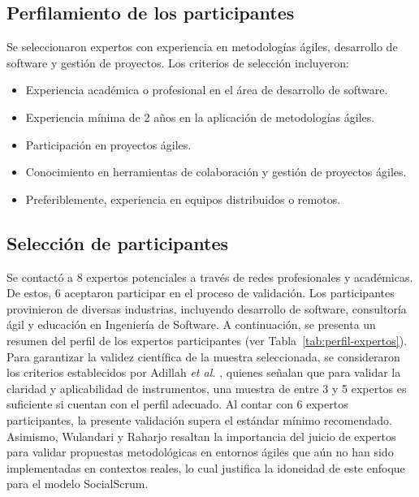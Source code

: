 \subsection{Perfilamiento de los participantes}
Se seleccionaron expertos con experiencia en metodologías ágiles, desarrollo de software y gestión de proyectos. Los criterios de selección incluyeron:
\begin{itemize}
   \item Experiencia académica o profesional en el área de desarrollo de software.
   \item Experiencia mínima de 2 años en la aplicación de metodologías ágiles.
   \item Participación en proyectos ágiles.
   \item Conocimiento en herramientas de colaboración y gestión de proyectos ágiles.
   \item Preferiblemente, experiencia en equipos distribuidos o remotos.
\end{itemize}

\subsection{Selección de participantes}
Se contactó a 8 expertos potenciales a través de redes profesionales y académicas. De estos, 6 aceptaron participar en el proceso de validación. Los participantes provinieron de diversas industrias, incluyendo desarrollo de software, consultoría ágil y educación en Ingeniería de Software. A continuación, se presenta un resumen del perfil de los expertos participantes (ver Tabla~\ref{tab:perfil-expertos}). Para garantizar la validez científica de la muestra seleccionada, se consideraron los criterios establecidos por Adillah \textit{et al.} \cite{Adillah2022}, quienes señalan que para validar la claridad y aplicabilidad de instrumentos, una muestra de entre 3 y 5 expertos es suficiente si cuentan con el perfil adecuado. Al contar con 6 expertos participantes, la presente validación supera el estándar mínimo recomendado. Asimismo, Wulandari y Raharjo \cite{wulandari2023ifejm} resaltan la importancia del juicio de expertos para validar propuestas metodológicas en entornos ágiles que aún no han sido implementadas en contextos reales, lo cual justifica la idoneidad de este enfoque para el modelo SocialScrum.

\begingroup
\scriptsize
\renewcommand{\arraystretch}{1.4}
\setlength{\tabcolsep}{3pt}


